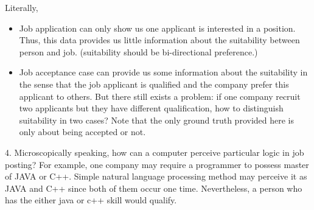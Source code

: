 \documentclass[11pt,a4paper]{article}
\begin{document}
   Literally,

\begin{itemize}
    \item{Job application can only show us one applicant is interested in a position.
   Thus, this data provides us little information about the suitability
   between person and job. (suitability should be bi-directional preference.)}

   \item{Job acceptance case can provide us some information about the suitability
   in the sense that the job applicant is qualified and the company prefer
   this applicant to others. But there still exists a problem: if one company
   recruit two applicants but they have different qualification, how to
   distinguish suitability in two cases? Note that the only ground truth provided here
   is only about being accepted or not.}
\end{itemize}

4. Microscopically speaking, how can a computer perceive particular logic in
job posting? For example, one company may require a programmer to possess
master of JAVA or C++. Simple natural language processing method may perceive
it as JAVA and C++ since both of them occur one time. Nevertheless, a person
who has the either java or c++ skill would qualify.
\end{document}
